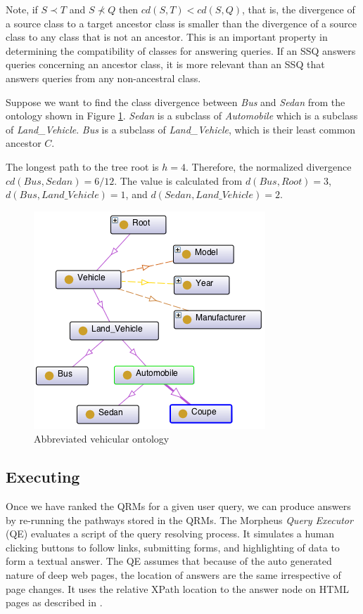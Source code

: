 Note, if $S \prec T$ and $S \not\prec Q$ then $cd(S,T) < cd(S,Q)$, that is, the divergence of a source class to a target ancestor class is smaller than the divergence of a source class to any class that is not an ancestor. This is an important property in determining the compatibility of classes for answering queries.  If an SSQ answers queries concerning an ancestor class, it is more relevant than an SSQ that answers queries from any non-ancestral class.

Suppose we want to find the class divergence between \emph{Bus} and \emph{Sedan} from the ontology shown in Figure \ref{fig:vehicular_ontology}. \emph{Sedan} is a subclass of \emph{Automobile} which is a subclass of \emph{Land\_Vehicle}.  \emph{Bus} is a subclass of \emph{Land\_Vehicle}, which is their least common ancestor $C$.  

The longest path to the tree root is $h = 4$. Therefore, the normalized divergence $cd(Bus, Sedan) = 6/12$. The value is calculated from $d(Bus, Root) = 3$, $d(Bus, Land\_Vehicle) = 1$, and $d(Sedan, Land\_Vehicle) = 2$.

\begin{figure}[t]
	\centering
	\includegraphics[scale=0.90]{OntologyDiagram.png}
	\caption{Abbreviated vehicular ontology}
	\label{fig:vehicular_ontology}
\end{figure}

\subsection{Executing} 

Once we have ranked the QRMs for a given user query, we can produce answers by re-running the pathways stored in the QRMs. The Morpheus \emph{Query Executor} (QE) evaluates a script of the query resolving process.  It simulates a human clicking buttons to follow links, submitting forms, and highlighting of data to form a textual answer.  The QE assumes that because of the auto generated nature of deep web pages, the location of answers are the same irrespective of page changes.  It uses the relative XPath location to the answer node on HTML pages as described in \cite{Badica06}.


